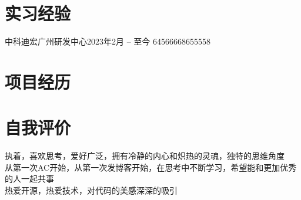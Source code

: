 \documentclass[a4paper,8pt]{article}
\begin{document}
\section{\textbf{实习经验}}
\resumeTable
{中科迪宏广州研发中心}{2023年2月 -- 至今}
{6456666}{8655558}


\section{\textbf{项目经历}}






\section{\textbf{自我评价}}
执着，喜欢思考，爱好广泛，拥有冷静的内心和炽热的灵魂，独特的思维角度 \\
从第一次AC开始，从第一次发博客开始，在思考中不断学习，希望能和更加优秀的人一起共事 \\
热爱开源，热爱技术，对代码的美感深深的吸引

\vfill
{}
\end{document}
